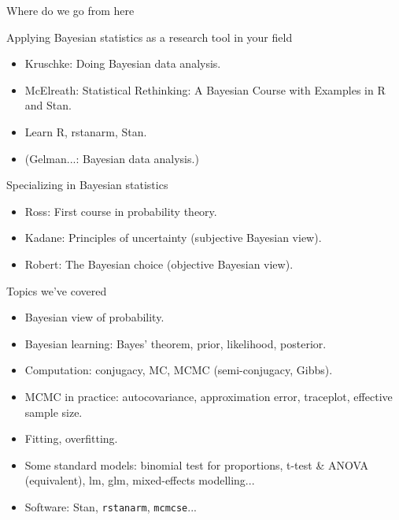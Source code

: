 \begin{frame}{Where do we go from here}

\begin{small}
  \begin{block}{Applying Bayesian statistics as a research tool in your field}
    \begin{itemize}
    \item Kruschke: Doing Bayesian data analysis.
    \item McElreath: Statistical Rethinking: A Bayesian Course with Examples in R and Stan.
    \item Learn R, rstanarm, Stan.
    \item (Gelman...: Bayesian data analysis.)
    \end{itemize}
  \end{block}
  
  \begin{alertblock}{Specializing in Bayesian statistics}
    \begin{itemize}
      \item Ross: First course in probability theory.
      \item Kadane: Principles of uncertainty (subjective Bayesian view).
      \item Robert: The Bayesian choice (objective Bayesian view).
    \end{itemize}

  \end{alertblock}

\end{small}

\end{frame}


\begin{frame}{Topics we've covered}

\begin{itemize}
\item Bayesian view of probability.
\item Bayesian learning: Bayes' theorem, prior, likelihood, posterior.
\item Computation: conjugacy, MC, MCMC (semi-conjugacy, Gibbs).
\item MCMC in practice: autocovariance, approximation error, traceplot, effective sample size.
\item Fitting, overfitting.
\item Some standard models: binomial test for proportions, t-test \& ANOVA (equivalent), lm, glm, mixed-effects modelling...
\item Software: Stan, \texttt{rstanarm}, \texttt{mcmcse}...
\end{itemize}

\end{frame}



